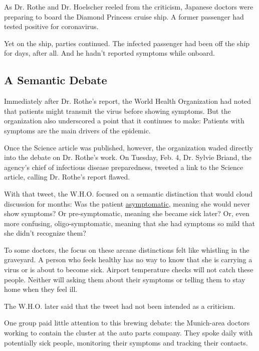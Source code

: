 As Dr. Rothe and Dr. Hoelscher reeled from the criticism, Japanese
doctors were preparing to board the Diamond Princess cruise ship. A
former passenger had tested positive for coronavirus.

Yet on the ship, parties continued. The infected passenger had been off
the ship for days, after all. And he hadn't reported symptoms while
onboard.

\hypertarget{a-semantic-debate}{%
\subsection{A Semantic Debate}\label{a-semantic-debate}}

Immediately after Dr. Rothe's report, the World Health Organization had
noted that patients might transmit the virus before showing symptoms.
But the organization also underscored a point that it continues to make:
Patients with symptoms are the main drivers of the epidemic.

Once the Science article was published, however, the organization waded
directly into the debate on Dr. Rothe's work. On Tuesday, Feb. 4, Dr.
Sylvie Briand, the agency's chief of infectious disease preparedness,
tweeted a link to the Science article, calling Dr. Rothe's report
flawed.

With that tweet, the W.H.O. focused on a semantic distinction that would
cloud discussion for months: Was the patient
\href{https://www.nytimes3xbfgragh.onion/2020/08/06/health/coronavirus-asymptomatic-transmission.html}{asymptomatic},
meaning she would never show symptoms? Or pre-symptomatic, meaning she
became sick later? Or, even more confusing, oligo-symptomatic, meaning
that she had symptoms so mild that she didn't recognize them?

To some doctors, the focus on these arcane distinctions felt like
whistling in the graveyard. A person who feels healthy has no way to
know that she is carrying a virus or is about to become sick. Airport
temperature checks will not catch these people. Neither will asking them
about their symptoms or telling them to stay home when they feel ill.

The W.H.O. later said that the tweet had not been intended as a
criticism.

One group paid little attention to this brewing debate: the Munich-area
doctors working to contain the cluster at the auto parts company. They
spoke daily with potentially sick people, monitoring their symptoms and
tracking their contacts.

